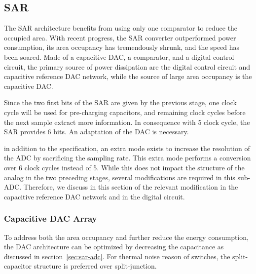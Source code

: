 \subsection{SAR}                            %
The SAR architecture benefits from using only one comparator to reduce the occupied area. With recent progress, the SAR converter outperformed power consumption, its area occupancy has tremendously shrunk, and the speed has been soared. Made of a capacitive DAC, a comparator, and a digital control circuit, the primary source of power dissipation are the digital control circuit and capacitive reference DAC network, while the source of large area occupancy is the capacitive DAC\@.

Since the two first bits of the SAR are given by the previous stage, one clock cycle will be used for pre-charging capacitors, and remaining clock cycles before the next sample extract more information. In consequence with 5 clock cycle, the SAR provides 6 bits. An adaptation of the DAC is necessary.

in addition to the specification, an extra mode exists to increase the resolution of the ADC by sacrificing the sampling rate. This extra mode performs a conversion over 6 clock cycles instead of 5. While this does not impact the structure of the analog in the two preceding stages, several modifications are required in this sub-ADC\@. Therefore, we discuss in this section of the relevant modification in the capacitive reference DAC network and in the digital circuit.

	\subsubsection{Capacitive DAC Array}    %
	\label{sec:capacitive-dac-sar-design}
To address both the area occupancy and further reduce the energy consumption, the DAC architecture can be optimized by decreasing the capacitance as discussed in section~\ref{sec:sar-adc}. For thermal noise reason of switches, the split-capacitor structure is preferred over split-junction.

